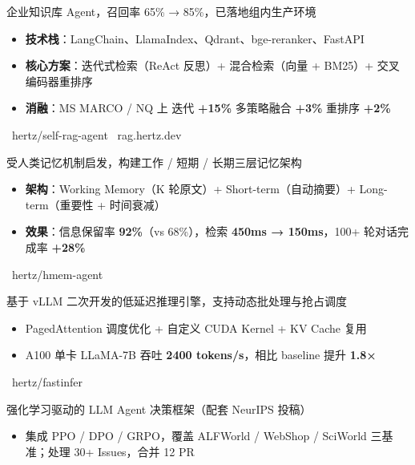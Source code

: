 

{企业知识库 Agent，召回率 65\% → 85\%，已落地组内生产环境}{%
\begin{itemize}
  \item \textbf{技术栈}：LangChain、LlamaIndex、Qdrant、bge-reranker、FastAPI
  \item \textbf{核心方案}：迭代式检索（ReAct 反思）+ 混合检索（向量 + BM25）+ 交叉编码器重排序
  \item \textbf{消融}：MS MARCO / NQ 上 迭代 \textbf{+15\%} \textbullet{} 多策略融合 \textbf{+3\%} \textbullet{} 重排序 \textbf{+2\%}
\end{itemize}
}{\faGithub\ hertz/self-rag-agent \quad \faGlobe\ rag.hertz.dev}

{受人类记忆机制启发，构建工作 / 短期 / 长期三层记忆架构}{%
\begin{itemize}
  \item \textbf{架构}：Working Memory（K 轮原文）+ Short-term（自动摘要）+ Long-term（重要性 + 时间衰减）
  \item \textbf{效果}：信息保留率 \textbf{92\%}（vs 68\%），检索 \textbf{450ms → 150ms}，100+ 轮对话完成率 \textbf{+28\%}
\end{itemize}
}{\faGithub\ hertz/hmem-agent}

{基于 vLLM 二次开发的低延迟推理引擎，支持动态批处理与抢占调度}{%
\begin{itemize}
  \item PagedAttention 调度优化 + 自定义 CUDA Kernel + KV Cache 复用
  \item A100 单卡 LLaMA-7B 吞吐 \textbf{2400 tokens/s}，相比 baseline 提升 \textbf{1.8×}
\end{itemize}
}{\faGithub\ hertz/fastinfer}


{强化学习驱动的 LLM Agent 决策框架（配套 NeurIPS 投稿）}{%
\begin{itemize}
  \item 集成 PPO / DPO / GRPO，覆盖 ALFWorld / WebShop / SciWorld 三基准；处理 30+ Issues，合并 12 PR
\end{itemize}
}

